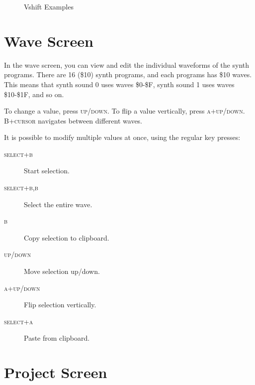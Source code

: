 \begin{figure}[htpb]
	\centering


	\caption{Vshift Examples}
	\label{fig:vshift}
\end{figure}

\section{Wave Screen}
\label{wave-screen-section}

In the wave screen, you can view and edit the individual waveforms of the synth programs. There are 16 (\$10) synth programs, and each programs has \$10 waves. This means that synth sound 0 uses waves \$0-\$F, synth sound 1 uses waves \$10-\$1F, and so on.

To change a value, press \textsc{up/down}. To flip a value vertically, press \textsc{a+up/down}.
\textsc{B+cursor} navigates between different waves.

It is possible to modify multiple values at once, using the regular key presses:

\begin{description}
	\item[\textsc{select+b}] Start selection.
	\item[\textsc{select+b,b}] Select the entire wave.
	\item[\textsc{b}] Copy selection to clipboard.
	\item[\textsc{up/down}] Move selection up/down.
	\item[\textsc{a+up/down}] Flip selection vertically.
	\item[\textsc{select+a}] Paste from clipboard.
\end{description}

\section{Project Screen}

